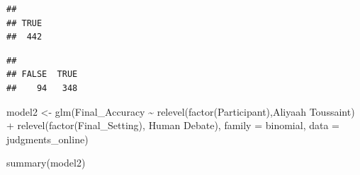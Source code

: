 \documentclass[
]{article}
\newenvironment{Shaded}{\begin{snugshade}}{\end{snugshade}}
\newcommand{\AttributeTok}[1]{\textcolor[rgb]{0.77,0.63,0.00}{#1}}
\newcommand{\FloatTok}[1]{\textcolor[rgb]{0.00,0.00,0.81}{#1}}
\newcommand{\FunctionTok}[1]{\textcolor[rgb]{0.00,0.00,0.00}{#1}}
\newcommand{\NormalTok}[1]{#1}
\newcommand{\OtherTok}[1]{\textcolor[rgb]{0.56,0.35,0.01}{#1}}
\newcommand{\SpecialCharTok}[1]{\textcolor[rgb]{0.00,0.00,0.00}{#1}}
\newcommand{\StringTok}[1]{\textcolor[rgb]{0.31,0.60,0.02}{#1}}
\begin{document}
\begin{Shaded}
\end{Shaded}

\begin{verbatim}
## 
## TRUE 
##  442
\end{verbatim}

\begin{Shaded}
\end{Shaded}

\begin{verbatim}
## 
## FALSE  TRUE 
##    94   348
\end{verbatim}

\begin{Shaded}
\begin{Highlighting}[]
\NormalTok{model2 }\OtherTok{\textless{}{-}} \FunctionTok{glm}\NormalTok{(Final\_Accuracy }\SpecialCharTok{\textasciitilde{}} \FunctionTok{relevel}\NormalTok{(}\FunctionTok{factor}\NormalTok{(Participant),}\StringTok{\textquotesingle{}Aliyaah Toussaint\textquotesingle{}}\NormalTok{) }\SpecialCharTok{+} \FunctionTok{relevel}\NormalTok{(}\FunctionTok{factor}\NormalTok{(Final\_Setting), }\StringTok{\textquotesingle{}Human Debate\textquotesingle{}}\NormalTok{), }\AttributeTok{family =} \StringTok{\textquotesingle{}binomial\textquotesingle{}}\NormalTok{, }\AttributeTok{data =}\NormalTok{ judgments\_online)}

\FunctionTok{summary}\NormalTok{(model2)}
\end{Highlighting}
\end{Shaded}
\end{document}
